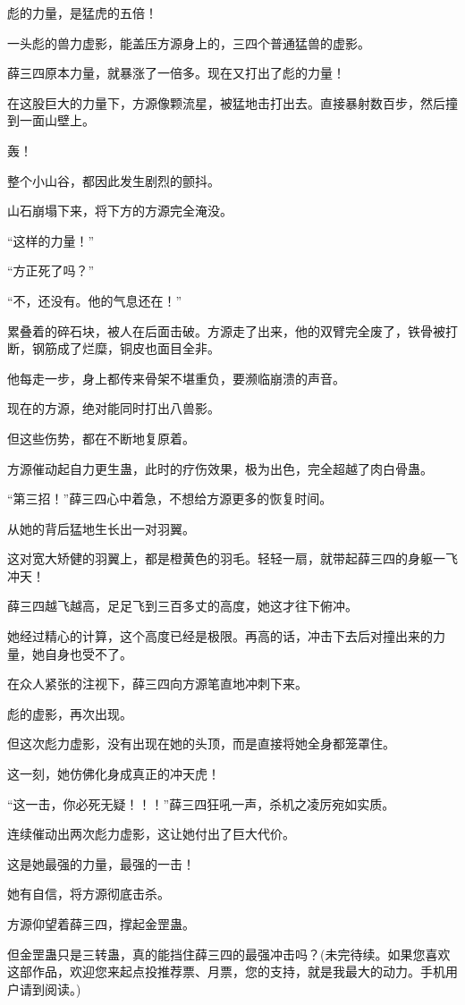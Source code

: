 \begin{this_body}
彪的力量，是猛虎的五倍！

一头彪的兽力虚影，能盖压方源身上的，三四个普通猛兽的虚影。

薛三四原本力量，就暴涨了一倍多。现在又打出了彪的力量！

在这股巨大的力量下，方源像颗流星，被猛地击打出去。直接暴射数百步，然后撞到一面山壁上。

轰！

整个小山谷，都因此发生剧烈的颤抖。

山石崩塌下来，将下方的方源完全淹没。

“这样的力量！”

“方正死了吗？”

“不，还没有。他的气息还在！”

累叠着的碎石块，被人在后面击破。方源走了出来，他的双臂完全废了，铁骨被打断，钢筋成了烂糜，铜皮也面目全非。

他每走一步，身上都传来骨架不堪重负，要濒临崩溃的声音。

现在的方源，绝对能同时打出八兽影。

但这些伤势，都在不断地复原着。

方源催动起自力更生蛊，此时的疗伤效果，极为出色，完全超越了肉白骨蛊。

“第三招！”薛三四心中着急，不想给方源更多的恢复时间。

从她的背后猛地生长出一对羽翼。

这对宽大矫健的羽翼上，都是橙黄色的羽毛。轻轻一扇，就带起薛三四的身躯一飞冲天！

薛三四越飞越高，足足飞到三百多丈的高度，她这才往下俯冲。

她经过精心的计算，这个高度已经是极限。再高的话，冲击下去后对撞出来的力量，她自身也受不了。

在众人紧张的注视下，薛三四向方源笔直地冲刺下来。

彪的虚影，再次出现。

但这次彪力虚影，没有出现在她的头顶，而是直接将她全身都笼罩住。

这一刻，她仿佛化身成真正的冲天虎！

“这一击，你必死无疑！！！”薛三四狂吼一声，杀机之凌厉宛如实质。

连续催动出两次彪力虚影，这让她付出了巨大代价。

这是她最强的力量，最强的一击！

她有自信，将方源彻底击杀。

方源仰望着薛三四，撑起金罡蛊。

但金罡蛊只是三转蛊，真的能挡住薛三四的最强冲击吗？(未完待续。如果您喜欢这部作品，欢迎您来起点投推荐票、月票，您的支持，就是我最大的动力。手机用户请到阅读。)

\end{this_body}

